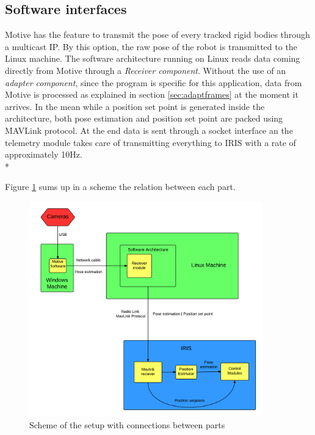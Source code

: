\subsection{Software interfaces}

Motive has the feature to transmit the pose of every tracked rigid bodies through a multicast IP. By this option, the raw pose of the robot is transmitted to the Linux machine. The software architecture running on Linux reads data coming directly from Motive through a \textit{Receiver component}. Without the use of an \textit{adapter component}, since the program is specific for this application, data from Motive is processed as explained in section \ref{sec:adaptframes} at the moment it arrives. In the mean while a position set point is generated inside the architecture, both pose estimation and position set point are packed using MAVLink protocol. At the end data is sent through a socket interface an the telemetry module takes care of transmitting everything to IRIS with a rate of approximately 10Hz. \\*

\noindent
Figure \ref{figure:integration} sums up in a scheme the relation between each part. 

\begin{figure}[h]
\centering
 \includegraphics[width=0.9\textwidth]{integration.png}
 \caption[Setup scheme]{Scheme of the setup with connections between parts}
 \label{figure:integration}
\end{figure}

